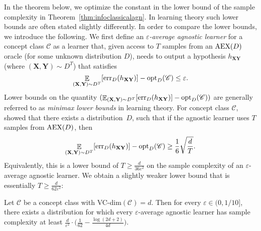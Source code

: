 \documentclass[twoside,11pt]{article}
\newcommand{\eps}{\varepsilon}
\newcommand{\AEX}{\mbox{\rm AEX}}
\newcommand{\err}{\mbox{\rm err}}
\newcommand{\opt}{\mbox{\rm opt}}
\DeclareMathOperator*{\Ex}{\mathbb{E}}
\newcommand{\C}{\ensuremath{\mathscr{C}}}
\begin{document}
In the theorem below, we optimize the constant in the lower bound of the sample complexity in Theorem~\ref{thm:infoclassicalagn}. 
In learning theory such lower bounds are often stated slightly differently. In order to compare the lower bounds, we introduce the following. We first define an \emph{$\eps$-average agnostic learner} for a concept class $\C$ as a learner that, given access to $T$ samples from an $\AEX(D)$ oracle (for some unknown distribution $D$), needs to output a hypothesis $h_{\mathbf{X}\mathbf{Y}}$ (where ${(\mathbf{X},\mathbf{Y})\sim D^T}$) that satisfies 
$$
\Ex_{(\mathbf{X},\mathbf{Y})\sim D^T} [ \err_D(h_{\mathbf{X}\mathbf{Y}})]- \opt_D(\C)\leq \eps.
$$
Lower bounds on the quantity $(\Ex_{(\mathbf{X},\mathbf{Y})\sim D^T} [ \err_D(h_{\mathbf{X}\mathbf{Y}})]- \opt_D(\C))$ are generally referred to as \emph{minimax lower bounds} in learning theory. For concept class $\C$,~\cite{audibert:agnosticconstant2,audibert:agnosticconstant1} showed that there exists a distribution~$D$, such that if the agnostic learner uses $T$ samples from $\AEX(D)$, then
$$
\Ex_{(\mathbf{X},\mathbf{Y})\sim D^T} [\err_D(h_{\mathbf{X}\mathbf{Y}})]- \opt_D(\C)\geq \frac{1}{6}\sqrt{\frac{d}{T}}.
$$
Equivalently, this is a lower bound of $T\geq \frac{d}{36\eps^2}$ on the sample complexity of an $\eps$-average agnostic learner. We obtain a slightly weaker lower bound that is essentially $T\geq \frac{d}{62\eps^2}$:

\begin{theorem}\label{thm:infoclassicalagnoptconstant}
	Let $\C$ be a concept class with VC-dim$(\C)=d$. Then for every $\eps \in (0,1/10]$, there exists a distribution for which every $\varepsilon$-average agnostic learner has sample complexity at least 
	$\frac{d}{\eps^2}\cdot \Big( \frac{1}{62}-\frac{\log(2d+2)}{4d}\Big)$.
\end{theorem}
\end{document}
